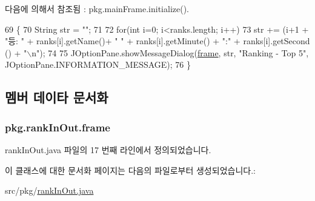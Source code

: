 다음에 의해서 참조됨 \+:  pkg.\+main\+Frame.\+initialize().


\begin{DoxyCode}
69                          \{
70         String str = \textcolor{stringliteral}{""};
71         
72         \textcolor{keywordflow}{for}(\textcolor{keywordtype}{int} i=0; i<ranks.length; i++)
73             str += (i+1 + \textcolor{stringliteral}{"등: "} + ranks[i].getName()+ \textcolor{stringliteral}{" "} + ranks[i].getMinute() + \textcolor{stringliteral}{":"} + ranks[i].getSecond
      () + \textcolor{stringliteral}{"\(\backslash\)n"});
74         
75         JOptionPane.showMessageDialog(\hyperlink{classpkg_1_1rank_in_out_a0a737c3e6741f3a5de20880af7f26662}{frame}, str, \textcolor{stringliteral}{"Ranking - Top 5"}, JOptionPane.INFORMATION\_MESSAGE);
76     \}
\end{DoxyCode}


\subsection{멤버 데이타 문서화}
\subsubsection[{\texorpdfstring{frame}{frame}}]{ pkg.\+rank\+In\+Out.\+frame\hspace{0.3cm}{\ttfamily [private]}}\hypertarget{classpkg_1_1rank_in_out_a0a737c3e6741f3a5de20880af7f26662}{}\label{classpkg_1_1rank_in_out_a0a737c3e6741f3a5de20880af7f26662}


rank\+In\+Out.\+java 파일의 17 번째 라인에서 정의되었습니다.



이 클래스에 대한 문서화 페이지는 다음의 파일로부터 생성되었습니다.\+:\begin{DoxyCompactItemize}
\item 
src/pkg/\hyperlink{rank_in_out_8java}{rank\+In\+Out.\+java}\end{DoxyCompactItemize}
